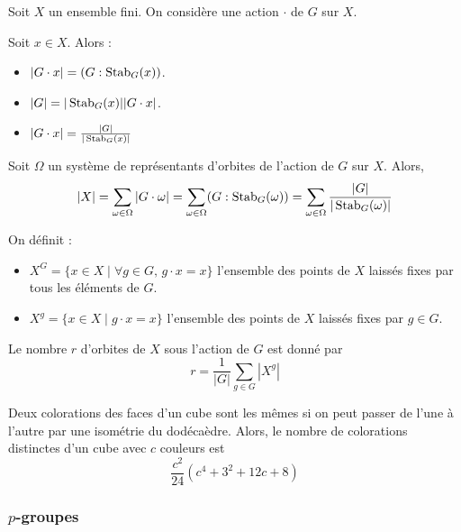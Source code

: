 
  Soit $X$ un ensemble fini. On considère une action $\cdot$ de $G$ sur $X$.

  \begin{proposition}
    Soit $x \in X$. Alors :
    \begin{itemize}
      \item $|G \cdot x| = (G : \operatorname{Stab}_G(x))$.
      \item $|G| = |\operatorname{Stab}_G(x)| |G \cdot x|$.
      \item $|G \cdot x| = \frac{|G|}{|\operatorname{Stab}_G(x)|}$
    \end{itemize}
  \end{proposition}

  \begin{theorem}
    Soit $\Omega$ un système de représentants d'orbites de l'action de $G$ sur $X$. Alors,
    \[ |X| = \sum_{\omega \in \Omega} |G \cdot \omega| = \sum_{\omega \in \Omega} (G : \operatorname{Stab}_G(\omega)) = \sum_{\omega \in \Omega} \frac{|G|}{|\operatorname{Stab}_G(\omega)|} \]
  \end{theorem}

  \begin{definition}
    On définit :
    \begin{itemize}
      \item $X^G = \{ x \in X \mid \forall g \in G, \, g \cdot x = x \}$ l'ensemble des points de $X$ laissés fixes par tous les éléments de $G$.
      \item $X^g = \{ x \in X \mid g \cdot x = x \}$ l'ensemble des points de $X$ laissés fixes par $g \in G$.
    \end{itemize}
  \end{definition}

  \begin{theorem}
    Le nombre $r$ d'orbites de $X$ sous l'action de $G$ est donné par
    \[ r = \frac{1}{|G|} \sum_{g \in G} |X^g| \]
  \end{theorem}


  \begin{application}
    Deux colorations des faces d'un cube sont les mêmes si on peut passer de l'une à l'autre par une isométrie du dodécaèdre. Alors, le nombre de colorations distinctes d'un cube avec $c$ couleurs est
    \[ \frac{c^2}{24} (c^4 + 3^2 + 12c + 8) \]
  \end{application}

  \subsubsection{\texorpdfstring{$p$}{p}-groupes}

